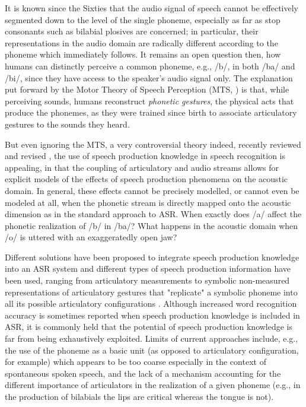 It is known since the Sixties \cite{liberman1} that the audio signal of speech
cannot be effectively segmented down to the level of the single phoneme,
especially as far as stop consonants such as bilabial plosives
are concerned; in particular, their representations in the audio domain are
radically different according to the phoneme which immediately follows.
It remains an open question then, how humans can distinctly perceive a common
phoneme, e.g., /b/, in both /ba/ and /bi/, since they have access to the speaker's
audio signal only. The explanation put forward by the Motor Theory of Speech Perception
(MTS, \cite{liberman2}) is that, while perceiving sounds, humans reconstruct
\emph{phonetic gestures}, the physical acts that produce the phonemes, as they were
trained since birth to associate articulatory gestures to the sounds they heard.

But even ignoring the MTS, a very controversial theory indeed, recently reviewed and
revised \cite{galant,massaro}, the use of speech production knowledge in speech recognition
is appealing, in that the coupling of articulatory and audio streams allows for explicit models
of the effects of speech production phenomena on the acoustic domain.
In general, these effects cannot be precisely modelled, or cannot even be modeled at all,
when the phonetic stream is directly mapped onto the acoustic dimension as in the standard
approach to ASR. When exactly does /a/ affect the phonetic realization of /b/ in /ba/?
What happens in the acoustic domain when /o/ is uttered with an exaggeratedly open jaw?

Different solutions have been proposed to integrate speech production knowledge into an ASR system
and different types of speech production information have been used, ranging from articulatory
measurements \cite{zlokarnik,stephenson,wrench} to symbolic non-measured representations of
articulatory gestures that "replicate" a symbolic phoneme into all its possible articulatory
configurations \cite{richardson, livescu}.   
Although increased word recognition accuracy is sometimes reported when speech production
knowledge is included in ASR, it is commonly held that the potential of speech production
knowledge is far from being exhaustively exploited. Limits of current approaches include, e.g.,
the use of the phoneme as a basic unit (as opposed to articulatory configuration, for example)
which appears to be too coarse especially in the context of spontaneous spoken speech,
and the lack of a mechanism accounting for the different importance of articulators in the
realization of a given phoneme (e.g., in the production of bilabials the lips are critical whereas
the tongue is not).


